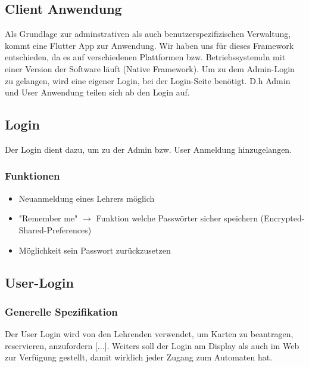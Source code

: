\documentclass[a4paper]{article}
\begin{document}

\subsection{Client Anwendung}
Als Grundlage zur adminstrativen als auch benutzerspezifizischen Verwaltung, kommt eine Flutter App zur Anwendung. Wir haben uns für dieses Framework entschieden, da es auf verschiedenen Plattformen bzw. Betriebssystemdn mit einer Version der Software läuft (Native Framework). Um zu dem Admin-Login zu gelangen, wird eine eigener Login, bei der Login-Seite benötigt. D.h Admin und User Anwendung teilen sich ab den Login auf.

\subsection{Login}
Der Login dient dazu, um zu der Admin bzw. User Anmeldung hinzugelangen.
\subsubsection{Funktionen}
\begin{itemize}
  \item Neuanmeldung eines Lehrers möglich
  \item "Remember me" $\rightarrow$ Funktion welche Passwörter sicher speichern (Encrypted-Shared-Preferences)
  \item Möglichkeit sein Passwort zurückzusetzen  
\end{itemize}

\subsection{User-Login}
\subsubsection{Generelle Spezifikation}
Der User Login wird von den Lehrenden verwendet, um Karten zu beantragen, reservieren, anzufordern [...]. Weiters soll der Login am Display als auch im Web zur Verfügung gestellt, damit wirklich jeder Zugang zum Automaten hat. 
\end{document}
